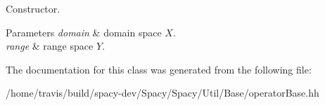 \-Constructor. 


\begin{DoxyParams}{\-Parameters}
{\em domain} & domain space $X$. \\
\hline
{\em range} & range space $Y$. \\
\hline
\end{DoxyParams}


\-The documentation for this class was generated from the following file\-:\begin{DoxyCompactItemize}
\item 
/home/travis/build/spacy-\/dev/\-Spacy/\-Spacy/\-Util/\-Base/operator\-Base.\-hh\end{DoxyCompactItemize}
